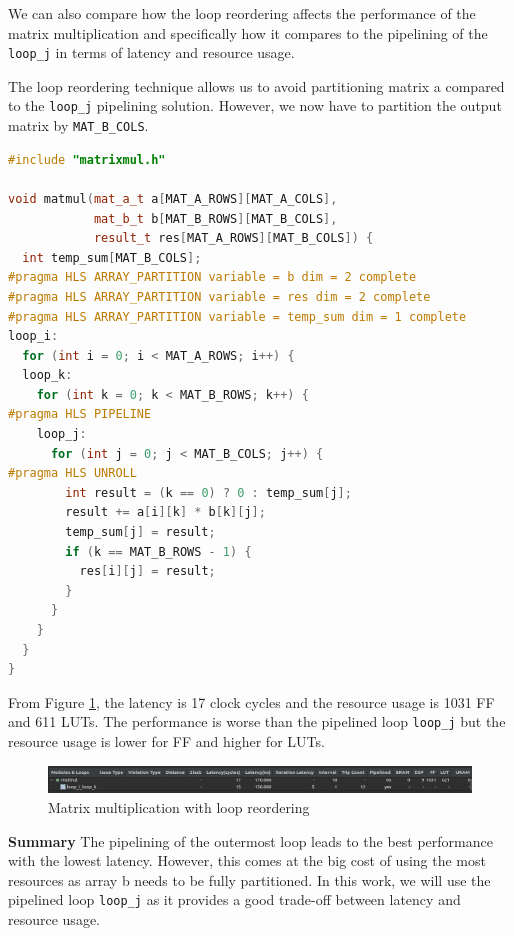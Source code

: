 \documentclass[a4paper, twoside]{report}
\theoremstyle{definition}
\numberwithin{equation}{section}
\begin{document}
We can also compare how the loop reordering affects the performance of the matrix multiplication
and specifically how it compares to the pipelining of the \texttt{loop\_j} in terms of latency and resource usage.

The loop reordering technique allows us to avoid partitioning matrix a compared to the \texttt{loop\_j} pipelining solution. However,
we now have to partition the output matrix by \texttt{MAT\_B\_COLS}.

\begin{lstlisting}[language=c++,numbers=none]
#include "matrixmul.h"

void matmul(mat_a_t a[MAT_A_ROWS][MAT_A_COLS],
            mat_b_t b[MAT_B_ROWS][MAT_B_COLS],
            result_t res[MAT_A_ROWS][MAT_B_COLS]) {
  int temp_sum[MAT_B_COLS];
#pragma HLS ARRAY_PARTITION variable = b dim = 2 complete
#pragma HLS ARRAY_PARTITION variable = res dim = 2 complete
#pragma HLS ARRAY_PARTITION variable = temp_sum dim = 1 complete
loop_i:
  for (int i = 0; i < MAT_A_ROWS; i++) {
  loop_k:
    for (int k = 0; k < MAT_B_ROWS; k++) {
#pragma HLS PIPELINE
    loop_j:
      for (int j = 0; j < MAT_B_COLS; j++) {
#pragma HLS UNROLL
        int result = (k == 0) ? 0 : temp_sum[j];
        result += a[i][k] * b[k][j];
        temp_sum[j] = result;
        if (k == MAT_B_ROWS - 1) {
          res[i][j] = result;
        }
      }
    }
  }
}
\end{lstlisting}

From Figure \ref{fig:matmul_loop_reordering}, the latency is 17 clock cycles
and the resource usage is 1031 FF and 611 LUTs.
The performance is worse than the pipelined loop \texttt{loop\_j} but the resource usage is lower for FF and higher for LUTs.

\begin{figure}[h!]
    \centering
    \includegraphics[width=\textwidth]{matmul_loop_reordering.png}
    \caption{Matrix multiplication with loop reordering}
    \label{fig:matmul_loop_reordering}
\end{figure}

\textbf{Summary}
The pipelining of the outermost loop leads to the best performance with the lowest latency.
However, this comes at the big cost of using the most resources as array b
needs to be fully partitioned.
In this work, we will use the pipelined loop \texttt{loop\_j}
as it provides a good trade-off between latency and resource usage.
\end{document}
